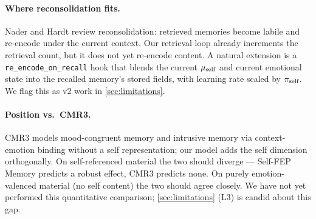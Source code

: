 \paragraph{Where reconsolidation fits.}
Nader and Hardt \cite{nader2011reconsolidation} review reconsolidation:
retrieved memories become labile and re-encode under the current context.
Our retrieval loop already increments the retrieval count, but it does
not yet re-encode content. A natural extension is a
\texttt{re\_encode\_on\_recall} hook that blends the current $\mu_{\text{self}}$
and current emotional state into the recalled memory's stored fields,
with learning rate scaled by $\pi_{\text{self}}$. We flag this as v2 work in
\cref{sec:limitations}.

\paragraph{Position vs.\ CMR3.}
CMR3 \cite{cohen2022cmr3} models mood-congruent memory and intrusive
memory via context-emotion binding without a self representation; our
model adds the self dimension orthogonally. On self-referenced material
the two should diverge --- Self-FEP Memory predicts a robust effect,
CMR3 predicts none. On purely emotion-valenced material (no self
content) the two should agree closely. We have not yet performed this
quantitative comparison; \cref{sec:limitations} (L3) is candid about
this gap.
